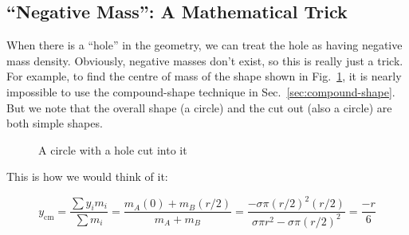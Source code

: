 \subsection{``Negative Mass'': A Mathematical Trick}
When there is a ``hole'' in the geometry, we can treat the hole as having
negative mass density. Obviously, negative masses don't exist, so this is
really just a trick. For example, to find the centre of mass of the shape
shown in Fig.~\ref{fig:hole}, it is nearly impossible to use the compound-shape
technique in Sec.~\ref{sec:compound-shape}. But we note that the overall shape
(a circle) and the cut out (also a circle) are both simple shapes.
\begin{figure}[ht]
  \centering
  \caption{A circle with a hole cut into it}
  \label{fig:hole}
\end{figure}

This is how we would think of it:
\begin{figure}[ht]
  \centering
\end{figure}
\begin{equation*}
  y_\text{cm}
  =\frac{\sum y_i m_i}{\sum m_i}
  =\frac{m_A(0) + m_B (r/2)}{m_A+m_B}
  =\frac{-\sigma\pi\left(r/2\right)^2(r/2)}
  {\sigma\pi r^2-\sigma\pi\left(r/2\right)^2}
  =\frac{-r}6
\end{equation*}




